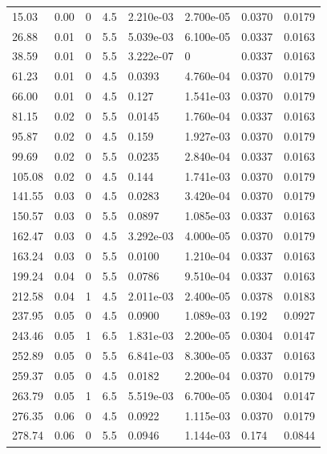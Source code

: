 \documentclass[preview]{standalone}
\begin{document}
{{\begin{tabular}{L{1.2cm}C{1.2cm} C{0.3cm}C{0.5cm} C{1.4cm}C{1.4cm} C{1.4cm}C{1.4cm}}
  15.03  &  0.00  & 0     & 4.5 &  2.210e-03  & 2.700e-05  & 0.0370 &  0.0179   \\ 
  26.88  &  0.01  & 0     & 5.5 &  5.039e-03  & 6.100e-05  & 0.0337 &  0.0163   \\ 
  38.59  &  0.01  & 0     & 5.5 &  3.222e-07  & 0  & 0.0337 &  0.0163   \\ 
  61.23  &  0.01  & 0     & 4.5 &  0.0393  & 4.760e-04  & 0.0370 &  0.0179   \\ 
  66.00  &  0.01  & 0     & 4.5 &  0.127  & 1.541e-03  & 0.0370 &  0.0179   \\ 
  81.15  &  0.02  & 0     & 5.5 &  0.0145  & 1.760e-04  & 0.0337 &  0.0163   \\ 
  95.87  &  0.02  & 0     & 4.5 &  0.159  & 1.927e-03  & 0.0370 &  0.0179   \\ 
  99.69  &  0.02  & 0     & 5.5 &  0.0235  & 2.840e-04  & 0.0337 &  0.0163   \\ 
  105.08  &  0.02  & 0     & 4.5 &  0.144  & 1.741e-03  & 0.0370 &  0.0179   \\ 
  141.55  &  0.03  & 0     & 4.5 &  0.0283  & 3.420e-04  & 0.0370 &  0.0179   \\ 
  150.57  &  0.03  & 0     & 5.5 &  0.0897  & 1.085e-03  & 0.0337 &  0.0163   \\ 
  162.47  &  0.03  & 0     & 4.5 &  3.292e-03  & 4.000e-05  & 0.0370 &  0.0179   \\ 
  163.24  &  0.03  & 0     & 5.5 &  0.0100  & 1.210e-04  & 0.0337 &  0.0163   \\ 
  199.24  &  0.04  & 0     & 5.5 &  0.0786  & 9.510e-04  & 0.0337 &  0.0163   \\ 
  212.58  &  0.04  & 1     & 4.5 &  2.011e-03  & 2.400e-05  & 0.0378 &  0.0183   \\ 
  237.95  &  0.05  & 0     & 4.5 &  0.0900  & 1.089e-03  & 0.192 &  0.0927   \\ 
  243.46  &  0.05  & 1     & 6.5 &  1.831e-03  & 2.200e-05  & 0.0304 &  0.0147   \\ 
  252.89  &  0.05  & 0     & 5.5 &  6.841e-03  & 8.300e-05  & 0.0337 &  0.0163   \\ 
  259.37  &  0.05  & 0     & 4.5 &  0.0182  & 2.200e-04  & 0.0370 &  0.0179   \\ 
  263.79  &  0.05  & 1     & 6.5 &  5.519e-03  & 6.700e-05  & 0.0304 &  0.0147   \\ 
  276.35  &  0.06  & 0     & 4.5 &  0.0922  & 1.115e-03  & 0.0370 &  0.0179   \\ 
  278.74  &  0.06  & 0     & 5.5 &  0.0946  & 1.144e-03  & 0.174 &  0.0844   \\ 

\end{tabular}}}
\end{document}
